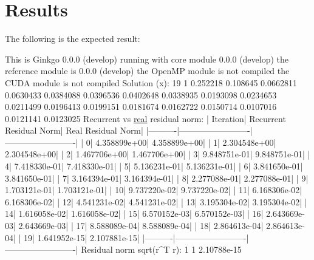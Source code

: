 \section*{Results}

The following is the expected result\+:


\begin{DoxyCode}
This is Ginkgo 0.0.0 (develop)
    running with core module 0.0.0 (develop)
    the reference module is  0.0.0 (develop)
    the OpenMP    module is  not compiled
    the CUDA      module is  not compiled
Solution (x):
19 1
0.252218
0.108645
0.0662811
0.0630433
0.0384088
0.0396536
0.0402648
0.0338935
0.0193098
0.0234653
0.0211499
0.0196413
0.0199151
0.0181674
0.0162722
0.0150714
0.0107016
0.0121141
0.0123025
Recurrent vs \hyperlink{namespacegko_ae23cfd886cee6e88d77bcbbbe1928b78}{real} residual norm:
| Iteration|  Recurrent Residual Norm|       Real Residual Norm|
|----------|-------------------------|-------------------------|
|         0|             4.358899e+00|             4.358899e+00|
|         1|             2.304548e+00|             2.304548e+00|
|         2|             1.467706e+00|             1.467706e+00|
|         3|             9.848751e-01|             9.848751e-01|
|         4|             7.418330e-01|             7.418330e-01|
|         5|             5.136231e-01|             5.136231e-01|
|         6|             3.841650e-01|             3.841650e-01|
|         7|             3.164394e-01|             3.164394e-01|
|         8|             2.277088e-01|             2.277088e-01|
|         9|             1.703121e-01|             1.703121e-01|
|        10|             9.737220e-02|             9.737220e-02|
|        11|             6.168306e-02|             6.168306e-02|
|        12|             4.541231e-02|             4.541231e-02|
|        13|             3.195304e-02|             3.195304e-02|
|        14|             1.616058e-02|             1.616058e-02|
|        15|             6.570152e-03|             6.570152e-03|
|        16|             2.643669e-03|             2.643669e-03|
|        17|             8.588089e-04|             8.588089e-04|
|        18|             2.864613e-04|             2.864613e-04|
|        19|             1.641952e-15|             2.107881e-15|
|----------|-------------------------|-------------------------|
Residual norm sqrt(r^T r):
1 1
2.10788e-15
\end{DoxyCode}



